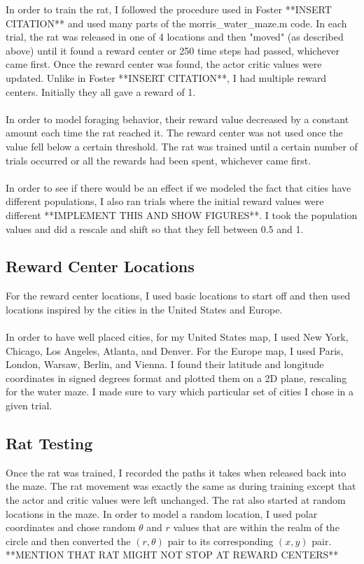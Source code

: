 \documentclass[conference]{IEEEtran}
\begin{document}
In order to train the rat, I followed the procedure used in Foster **INSERT CITATION** and used many parts of the morris\_water\_maze.m code. In each trial, the rat was released in one of 4 locations and then "moved" (as described above) until it found a reward center or 250 time steps had passed, whichever came first. Once the reward center was found, the actor critic values were updated. Unlike in Foster **INSERT CITATION**, I had multiple reward centers. Initially they all gave a reward of 1.\\
\\
In order to model foraging behavior, their reward value decreased by a constant amount each time the rat reached it. The reward center was not used once the value fell below a certain threshold. The rat was trained until a certain number of trials occurred or all the rewards had been spent, whichever came first. \\
\\
In order to see if there would be an effect if we modeled the fact that cities have different populations, I also ran trials where the initial reward values were different **IMPLEMENT THIS AND SHOW FIGURES**. I took the population values and did a rescale and shift so that they fell between 0.5 and 1. 

\subsection{Reward Center Locations}
For the reward center locations, I used basic locations to start off and then used locations inspired by the cities in the United States and Europe. \\
\\
In order to have well placed cities, for my United States map, I used New York, Chicago, Los Angeles, Atlanta, and Denver. For the Europe map, I used Paris, London, Warsaw, Berlin, and Vienna. I found their latitude and longitude coordinates in signed degrees format and plotted them on a 2D plane, rescaling for the water maze. I made sure to vary which particular set of cities I chose in a given trial. 

\subsection{Rat Testing}

Once the rat was trained, I recorded the paths it takes when released back into the maze. The rat movement was exactly the same as during training except that the actor and critic values were left unchanged. The rat also started at random locations in the maze. In order to model a random location, I used polar coordinates and chose random $\theta$ and $r$ values that are within the realm of the circle and then converted the $(r,\theta)$ pair to its corresponding $(x,y)$ pair. 
**MENTION THAT RAT MIGHT NOT STOP AT REWARD CENTERS**
\end{document}
